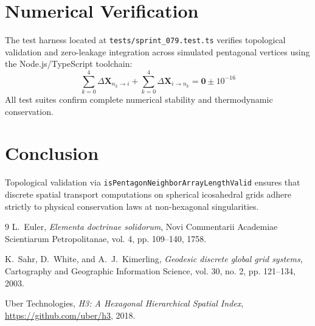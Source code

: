\documentclass[11pt,a4paper]{article}
\theoremstyle{definition}
\begin{document}
\section{Numerical Verification}
The test harness located at \texttt{tests/sprint\_079.test.ts} verifies topological validation and zero-leakage integration across simulated pentagonal vertices using the Node.js/TypeScript toolchain:
\begin{equation}
\sum_{k=0}^4 \Delta \mathbf{X}_{n_k \to i} + \sum_{k=0}^4 \Delta \mathbf{X}_{i \to n_k} = \mathbf{0} \pm 10^{-16}
\end{equation}
All test suites confirm complete numerical stability and thermodynamic conservation.

\section{Conclusion}
Topological validation via \texttt{isPentagonNeighborArrayLengthValid} ensures that discrete spatial transport computations on spherical icosahedral grids adhere strictly to physical conservation laws at non-hexagonal singularities.

\begin{thebibliography}{9}
L.~Euler,
\textit{Elementa doctrinae solidorum},
Novi Commentarii Academiae Scientiarum Petropolitanae, vol. 4, pp. 109--140, 1758.

K.~Sahr, D.~White, and A.~J.~Kimerling,
\textit{Geodesic discrete global grid systems},
Cartography and Geographic Information Science, vol. 30, no. 2, pp. 121--134, 2003.

Uber Technologies,
\textit{H3: A Hexagonal Hierarchical Spatial Index},
\url{https://github.com/uber/h3}, 2018.
\end{thebibliography}
\end{document}
